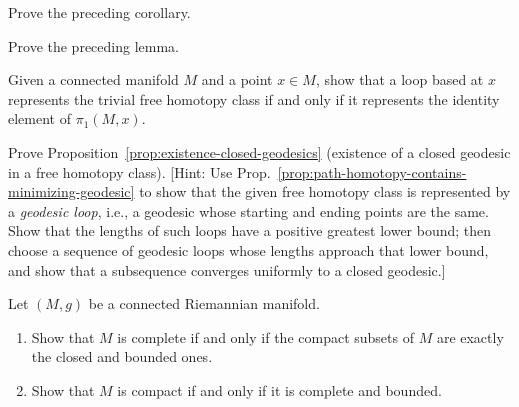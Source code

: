 \begin{exercise}
\label{exer:prove-local-distance-corollary}

Prove the preceding corollary.
\end{exercise}

\begin{exercise}
\label{exer:prove-minimizing-lemma}

Prove the preceding lemma.
\end{exercise}

\begin{exercise}
\label{exer:trivial-free-homotopy-identity}

Given a connected manifold $M$ and a point $x \in M$, show that a loop based at $x$ represents the trivial free homotopy class if and only if it represents the identity element of $\pi_1(M, x)$.
\end{exercise}

\begin{exercise}
\label{prob:closed-geodesic-free-homotopy}

Prove Proposition~\ref{prop:existence-closed-geodesics} (existence of a closed geodesic in a free homotopy class). [Hint: Use Prop.~\ref{prop:path-homotopy-contains-minimizing-geodesic} to show that the given free homotopy class is represented by a \emph{geodesic loop}, i.e., a geodesic whose starting and ending points are the same. Show that the lengths of such loops have a positive greatest lower bound; then choose a sequence of geodesic loops whose lengths approach that lower bound, and show that a subsequence converges uniformly to a closed geodesic.]
\end{exercise}

\begin{exercise}
\label{prob:compact-complete-characterization}

Let $(M, g)$ be a connected Riemannian manifold.
\begin{enumerate}
\item[(a)] Show that $M$ is complete if and only if the compact subsets of $M$ are exactly the closed and bounded ones.
\item[(b)] Show that $M$ is compact if and only if it is complete and bounded.
\end{enumerate}
\end{exercise}

